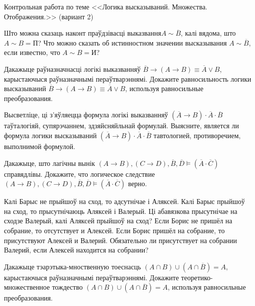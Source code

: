 \newpage

\begin{center}
	{Контрольная работа по теме <<Логика высказываний. Множества. Отображения.>> (вариант 2)}	
\end{center}

\begin{problemList}
	
	\problemItemSimple
	{Што можна сказаць наконт праўдзівасці выказвання$A \sim \overline{B}$, калі вядома, што $A \sim B = \mbox{П}$?}
	{Что можно сказать об истинностном значении высказывания $A \sim \overline{B}$, если известно, что $A \sim B = \mbox{И}$?}
	
	\problemItemSimple
	{Дакажыце раўназначнасці логікі выказванняў $\overline{B} \to (A \to B) \equiv \overline{A} \vee B$, карыстаючыся раўназначнымі пераўтварэннямі.}
	{Докажите равносильность логики высказываний $\overline{B} \to (A \to B) \equiv \overline{A} \vee B$, используя равносильные преобразования.}
	
	\problemItemSimple
	{Высветліце, ці з'яўляецца формула логікі выказванняў $(\overline{A} \to B) \cdot \overline{A} \cdot \overline{B}$ таўталогіяй, супярэчаннем, здзяйсняйльнай формулай.}
	{Выясните, является ли формула логики высказываний $(\overline{A} \to B) \cdot \overline{A} \cdot \overline{B}$ тавтологией, противоречием, выполнимой формулой.}
	
	\problemItemSimple
	{Дакажыце, што лагічны вынік $(A \to B), (C \to D), \overline{B}, \overline{D} \models (\overline{A} \cdot \overline{C})$ справядлівы.}
	{Докажите, что логическое следствие $(A \to B), (C \to D), \overline{B}, \overline{D} \models (\overline{A} \cdot \overline{C})$ верно.}
	
	\problemItemSimple
	{Калі Барыс не прыйшоў на сход, то адсутнічае і Аляксей. Калі Барыс прыйшоў на сход, то прысутнічаюць Аляксей і Валерый. Ці абавязкова прысутнічае на сходзе Валерый, калі Аляксей прыйшоў на сход?}
	{Если Борис не пришёл на собрание, то отсутствует и Алексей. Если Борис пришёл на собрание, то присутствуют Алексей и Валерий. Обязательно ли присутствует на собрании Валерий, если Алексей находится на собрании?}
	
	\problemItemSimple
	{Дакажыце тэарэтыка-мноственную тоеснасць $(A \cap B) \cup (A \cap \overline{B}) = A$, карыстаючыся раўназначнымі пераўтварэннямі.}
	{Докажите теоретико-множественное тождество $(A \cap B) \cup (A \cap \overline{B}) = A$, используя равносильные преобразования.}
	

\end{problemList}

